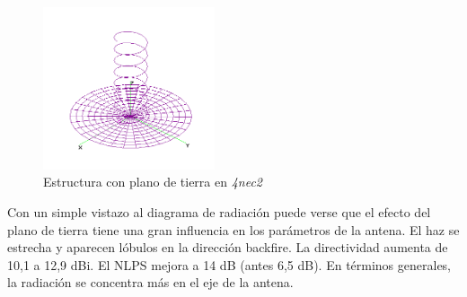 \documentclass[12pt]{article}
\begin{document}
\begin{figure}[H]
	\centering
	\includegraphics[width=0.45\textwidth]{antena_planotierra.png}
	\caption{Estructura con plano de tierra en \textit{4nec2}}
\end{figure}

Con un simple vistazo al diagrama de radiación puede verse que el efecto del plano de tierra tiene una gran influencia en los parámetros de la antena. El haz se estrecha y aparecen lóbulos en la dirección backfire. La directividad aumenta de 10,1 a 12,9 dBi. El NLPS mejora a 14 dB (antes 6,5 dB). En términos generales, la radiación se concentra más en el eje de la antena.\\
\end{document}
